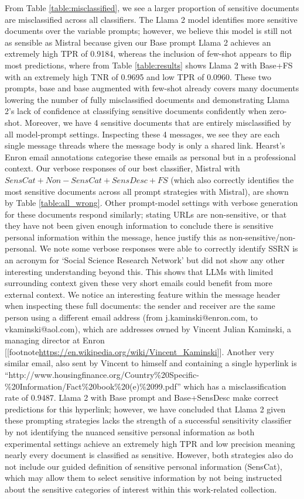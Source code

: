 From Table \ref{table:misclassified}, we see a larger proportion of sensitive documents are misclassified across all classifiers. The Llama 2 model identifies more sensitive documents over the variable prompts; however, we believe this model is still not as sensible as Mistral because given our Base prompt Llama 2 achieves an extremely high TPR of 0.9184, whereas the inclusion of few-shot appears to flip most predictions, where from Table \ref{table:results} shows Llama 2 with Base+FS with an extremely high TNR of 0.9695 and low TPR of 0.0960. These two prompts, base and base augmented with few-shot already covers many documents lowering the number of fully misclassified documents and demonstrating Llama 2’s lack of confidence at classifying sensitive documents confidently when zero-shot. Moreover, we have 4 sensitive documents that are entirely misclassified by all model-prompt settings. Inspecting these 4 messages, we see they are each single message threads where the message body is only a shared link. Hearst’s Enron email annotations categorise these emails as personal but in a professional context. Our verbose responses of our best classifier, Mistral with $SensCat+Non-SensCat+SensDesc+FS$ (which also correctly identifies the most sensitive documents across all prompt strategies with Mistral), are shown by Table \ref{table:all_wrong}. Other prompt-model settings with verbose generation for these documents respond similarly; stating URLs are non-sensitive, or that they have not been given enough information to conclude there is sensitive personal information within the message, hence justify this as non-sensitive/non-personal. We note some verbose responses were able to correctly identify SSRN is an acronym for ‘Social Science Research Network’ but did not show any other interesting understanding beyond this. This shows that LLMs with limited surrounding context given these very short emails could benefit from more external context. We notice an interesting feature within the message header when inspecting these full documents: the sender and receiver are the same person using a different email address (from j.kaminski@enron.com, to vkaminski@aol.com), which are addresses owned by Vincent Julian Kaminski, a managing director at Enron [[footnote{\url{https://en.wikipedia.org/wiki/Vincent_Kaminski}}]]. Another very similar email, also sent by Vincent to himself and containing a single hyperlink is “http://www.housingfinance.org/Country\%20Specific-\%20Information/Fact\%20book\%20(e)\%2099.pdf” which has a misclassification rate of 0.9487. Llama 2 with Base prompt and Base+SensDesc make correct predictions for this hyperlink; however, we have concluded that Llama 2 given these prompting strategies lacks the strength of a successful sensitivity classifier by not identifying the nuanced sensitive personal information as both experimental settings achieve an extremely high TPR and low precision meaning nearly every document is classified as sensitive. However, both strategies also do not include our guided definition of sensitive personal information (SensCat), which may allow them to select sensitive information by not being instructed about the sensitive categories of interest within this work-related collection.

